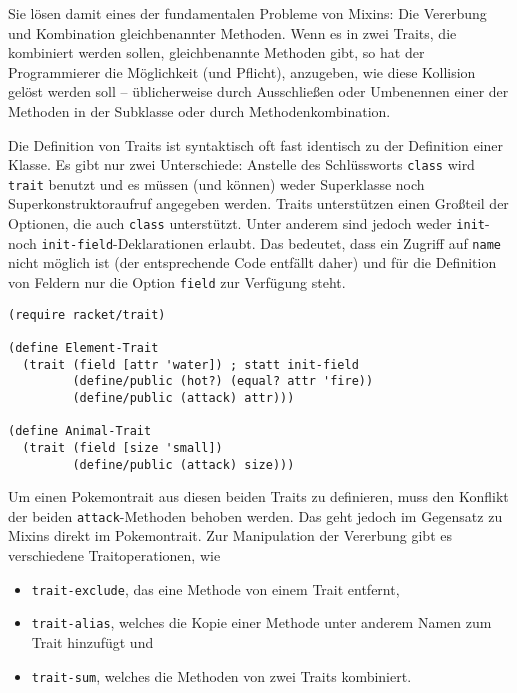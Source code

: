 Sie lösen damit eines der fundamentalen Probleme von Mixins: Die Vererbung und Kombination gleichbenannter Methoden. Wenn es in zwei Traits, die kombiniert werden sollen, gleichbenannte Methoden gibt, so hat der Programmierer die Möglichkeit (und Pflicht), anzugeben, wie diese Kollision gelöst werden soll -- üblicherweise durch Ausschließen oder Umbenennen einer der Methoden in der Subklasse oder durch Methodenkombination.

Die Definition von Traits ist syntaktisch oft fast identisch zu der Definition einer Klasse. Es gibt nur zwei Unterschiede: Anstelle des Schlüssworts \texttt{class} wird \texttt{trait} benutzt und es müssen (und können) weder Superklasse noch Superkonstruktoraufruf angegeben werden. Traits unterstützen einen Großteil der Optionen, die auch \texttt{class} unterstützt. Unter anderem sind jedoch weder \texttt{init}- noch \texttt{init-field}-Deklarationen erlaubt. Das bedeutet, dass ein Zugriff auf \texttt{name} nicht möglich ist (der entsprechende Code entfällt daher) und für die Definition von Feldern nur die Option \texttt{field} zur Verfügung steht.

\begin{lstlisting}
(require racket/trait)

(define Element-Trait
  (trait (field [attr 'water]) ; statt init-field
         (define/public (hot?) (equal? attr 'fire))
         (define/public (attack) attr)))

(define Animal-Trait
  (trait (field [size 'small])
         (define/public (attack) size)))
\end{lstlisting}

Um einen Pokemontrait aus diesen beiden Traits zu definieren, muss den Konflikt der beiden \texttt{attack}-Methoden behoben werden. Das geht jedoch im Gegensatz zu Mixins direkt im Pokemontrait. Zur Manipulation der Vererbung gibt es verschiedene Traitoperationen, wie
\begin{itemize}
 \item \texttt{trait-exclude}, das eine Methode von einem Trait entfernt, \vspace{-0.3cm}
 \item \texttt{trait-alias}, welches die Kopie einer Methode unter anderem Namen zum Trait hinzufügt und \vspace{-0.3cm}
 \item \texttt{trait-sum}, welches die Methoden von zwei Traits kombiniert.
\end{itemize}

